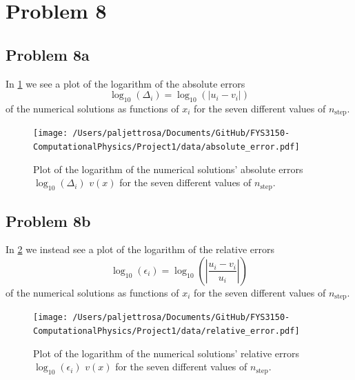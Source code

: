 \documentclass[english,notitlepage]{revtex4-1}  %
\begin{document}
\section*{Problem 8}
\subsection*{Problem 8a}
In \cref*{abs err} we see a plot of the logarithm of the absolute errors 
\begin{equation}
    \log_{10}(\Delta_i) = \log_{10}(|u_i - v_i|)
\end{equation}
of the numerical solutions as functions of $x_i$ for the seven different values of $n_\text{step}$.

\begin{figure}[h!]
    \centering 
    \texttt{[image: /Users/paljettrosa/Documents/GitHub/FYS3150-ComputationalPhysics/Project1/data/absolute\_error.pdf]} %
    \caption{Plot of the logarithm of the numerical solutions' absolute errors $\log_{10}(\Delta_i)$ $v(x)$ for the seven different values of $n_\text{step}$.}
    \label{abs err}
\end{figure}

\subsection*{Problem 8b}
In \cref{rel err} we instead see a plot of the logarithm of the relative errors 
\begin{equation}
    \log_{10}(\epsilon_i) = \log_{10}\left(\left|\frac{u_i - v_i}{u_i}\right|\right)
\end{equation}
of the numerical solutions as functions of $x_i$ for the seven different values of $n_\text{step}$.

\begin{figure}[h!]
    \centering 
    \texttt{[image: /Users/paljettrosa/Documents/GitHub/FYS3150-ComputationalPhysics/Project1/data/relative\_error.pdf]} %
    \caption{Plot of the logarithm of the numerical solutions' relative errors $\log_{10}(\epsilon_i)$ $v(x)$ for the seven different values of $n_\text{step}$.}
    \label{rel err}
\end{figure}
\end{document}
